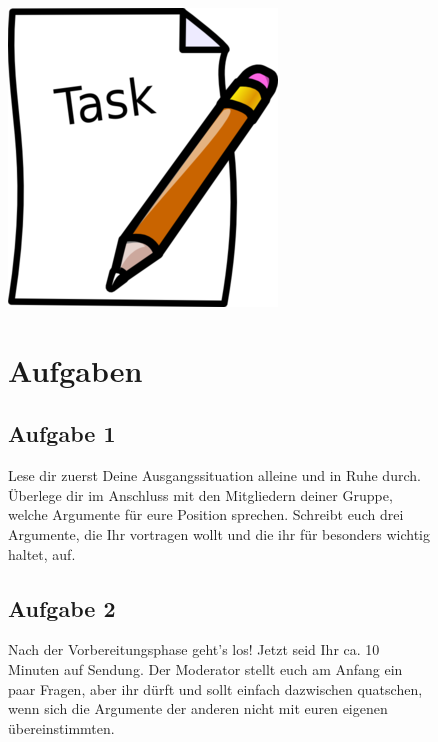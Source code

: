 \documentclass[11pt,a4paper,DIV=8,]{scrartcl}
\begin{document}
\begin{figure}[H]
\begin{minipage}[c]{0.15\linewidth}
\vspace{0pt}
\includegraphics[scale=0.3]{images/task}
\end{minipage}
\hfill
\begin{minipage}[c]{0.85\linewidth}
\section*{Aufgaben}
\subsection*{Aufgabe 1}
Lese dir zuerst Deine Ausgangssituation alleine und in Ruhe durch. Überlege dir im Anschluss mit den Mitgliedern deiner Gruppe, welche Argumente für eure Position sprechen. Schreibt euch drei Argumente, die
Ihr vortragen wollt und die ihr für besonders wichtig haltet, auf. 
\subsection*{Aufgabe 2}
Nach der Vorbereitungsphase geht’s los! Jetzt seid Ihr ca. 10 Minuten auf Sendung. Der Moderator stellt euch am Anfang ein paar Fragen, aber ihr dürft und sollt einfach dazwischen quatschen, wenn sich die Argumente
der anderen nicht mit euren eigenen übereinstimmten.
\end{minipage}
\end{figure}
%
\end{document}
